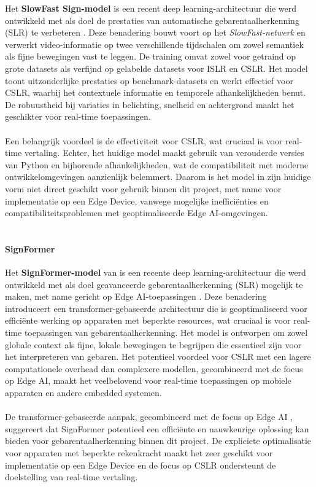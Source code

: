 Het \textbf{SlowFast Sign-model} is een recent deep learning-architectuur die werd ontwikkeld met als doel de prestaties van automatische gebarentaalherkenning (SLR) te verbeteren \citep{10445841}.
Deze benadering bouwt voort op het \textit{SlowFast-netwerk} en verwerkt video-informatie op twee verschillende tijdschalen om zowel semantiek als fijne bewegingen vast te leggen. De training omvat zowel voor getraind op grote datasets als verfijnd op gelabelde datasets voor ISLR en CSLR. Het model toont uitzonderlijke prestaties op benchmark-datasets en werkt effectief voor CSLR, waarbij het contextuele informatie en temporele afhankelijkheden benut. De robuustheid bij variaties in belichting, snelheid en achtergrond maakt het geschikter voor real-time toepassingen.
\\
\\
Een belangrijk voordeel is de effectiviteit voor CSLR, wat cruciaal is voor real-time vertaling. Echter, het huidige model maakt gebruik van verouderde versies van Python en bijhorende afhankelijkheden, wat de compatibiliteit met moderne ontwikkelomgevingen aanzienlijk belemmert. Daarom is het model in zijn huidige vorm niet direct geschikt voor gebruik binnen dit project, met name voor implementatie op een Edge Device, vanwege mogelijke inefficiënties en compatibiliteitsproblemen met geoptimaliseerde Edge AI-omgevingen.
\\
\\
\paragraph{SignFormer}

Het \textbf{SignFormer-model} van \textcite{eta2024signformer} is een recente deep learning-architectuur die werd ontwikkeld met als doel geavanceerde gebarentaalherkenning (SLR) mogelijk te maken, met name gericht op Edge AI-toepassingen \citep{eta2024signformer}.
Deze benadering introduceert een transformer-gebaseerde architectuur die is geoptimaliseerd voor efficiënte werking op apparaten met beperkte resources, wat cruciaal is voor real-time toepassingen van gebarentaalherkenning. Het model is ontworpen om zowel globale context als fijne, lokale bewegingen te begrijpen die essentieel zijn voor het interpreteren van gebaren. Het potentieel voordeel voor CSLR met een lagere computationele overhead dan complexere modellen, gecombineerd met de focus op Edge AI, maakt het veelbelovend voor real-time toepassingen op mobiele apparaten en andere embedded systemen.
\\
\\
De transformer-gebaseerde aanpak, gecombineerd met de focus op Edge AI \citep{eta2024signformer}, suggereert dat SignFormer potentieel een efficiënte en nauwkeurige oplossing kan bieden voor gebarentaalherkenning binnen dit project. De expliciete optimalisatie voor apparaten met beperkte rekenkracht maakt het zeer geschikt voor implementatie op een Edge Device en de focus op CSLR ondersteunt de doelstelling van real-time vertaling.
